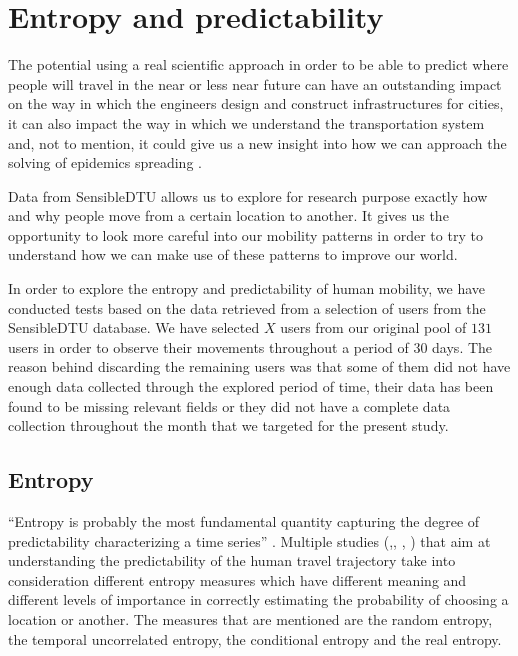 \chapter{Entropy and predictability}

The potential using a real scientific approach in order to be able to predict
where people will travel in the near or less near future can have an outstanding
impact on the way in which the engineers design and construct infrastructures
for cities, it can also impact the way in which we understand the transportation
system and, not to mention, it could give us a new insight into how we can
approach the solving of epidemics spreading \cite{Lu13} \cite{Brockmann08}.

Data from SensibleDTU \cite{Stopczynski14m} allows us to explore for research
purpose exactly how and why people move from a certain location to another. It
gives us the opportunity to look more careful into our mobility patterns in
order to try to understand how we can make use of these patterns to improve our
world.

In order to explore the entropy and predictability of human mobility, we have
conducted tests based on the data retrieved from a selection of users from the
SensibleDTU database. We have selected $X$ users from our original pool of $131$
users in order to observe their movements throughout a period of $30$ days. The
reason behind discarding the remaining users was that some of them did not have
enough data collected through the explored period of time, their data has been
found to be missing relevant fields or they did not have a complete data
collection throughout the month that we targeted for the present study.

\section{Entropy}

``Entropy is probably the most fundamental quantity capturing the degree of
predictability characterizing a time series'' \cite{Barabasi10}. Multiple
studies (\cite{Sinatra14},\cite{Lu13}, \cite{marin2012exploring},
\cite{Barabasi10}) that aim at understanding the predictability of the human
travel trajectory take into consideration different entropy measures which have
different meaning and different levels of importance in correctly estimating the
probability of choosing a location or another. The measures that are mentioned
are the random entropy, the temporal uncorrelated entropy, the conditional
entropy and the real entropy.

